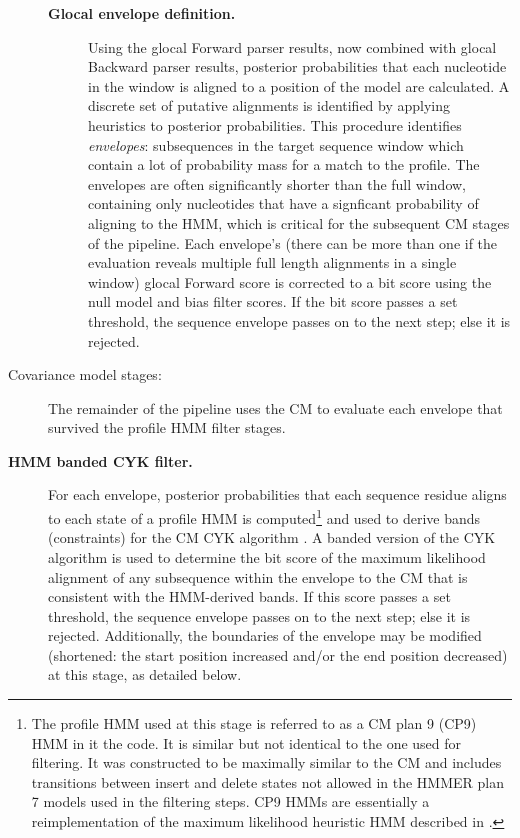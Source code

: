 \begin{description}
\begin{description}
\item[\textbf{Glocal envelope definition.}] Using the glocal Forward
  parser results, now combined with glocal Backward parser results,
  posterior probabilities that each nucleotide in the window is aligned
  to a position of the model are calculated. A discrete set of
  putative alignments is identified by applying heuristics to
  posterior probabilities. This procedure identifies \emph{envelopes}:
  subsequences in the target sequence window which contain a lot of
  probability mass for a match to the profile. The envelopes are often
  significantly shorter than the full window, containing only nucleotides
  that have a signficant probability of aligning to the HMM, which is
  critical for the subsequent CM stages of the pipeline. Each
  envelope's (there can be more than one if the evaluation reveals
  multiple full length alignments in a single window) glocal Forward
  score is corrected to a bit score using the null model and bias
  filter scores. If the bit score passes a set threshold, the sequence
  envelope passes on to the next step; else it is rejected.

\end{description}

\item[Covariance model stages:] The remainder of the pipeline uses the
  CM to evaluate each envelope that survived the profile HMM filter
  stages. 

\item[\textbf{HMM banded CYK filter.}] For each envelope, posterior
  probabilities that each sequence residue aligns to each state of a
  profile HMM is computed\footnote{The profile HMM used at this stage
  is referred to as a CM plan 9 (CP9) HMM in it the code. It is
  similar but not identical to the one used for filtering. It was
  constructed to be maximally similar to the CM and includes
  transitions between insert and delete states not allowed in the
  HMMER plan 7 models used in the filtering steps. CP9 HMMs are
  essentially a reimplementation of the maximum likelihood heuristic
  HMM described in \citep{WeinbergRuzzo06}.} and used to derive bands
  (constraints) for the CM CYK algorithm \citep{Brown00,
  Nawrocki09}. A banded version of the CYK algorithm is used to
  determine the bit score of the maximum likelihood alignment of any
  subsequence within the envelope to the CM that is consistent with
  the HMM-derived bands. If this score passes a set threshold, the
  sequence envelope passes on to the next step; else it is rejected. 
  Additionally, the boundaries of the envelope may be modified
  (shortened: the start position increased and/or the end position
  decreased) at this stage, as detailed below.


\end{description}
